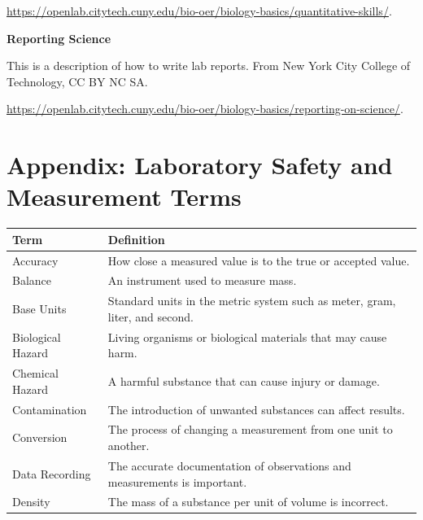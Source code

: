\documentclass[
  letterpaper,
  DIV=11,
  numbers=noendperiod]{scrreprt}
\newcounter{none} %
\begin{document}
\url{https://openlab.citytech.cuny.edu/bio-oer/biology-basics/quantitative-skills/}.

\textbf{Reporting Science}

This is a description of how to write lab reports. From New York City
College of Technology, CC BY NC SA.

\url{https://openlab.citytech.cuny.edu/bio-oer/biology-basics/reporting-on-science/}.

\section{\texorpdfstring{\textbf{Appendix: Laboratory Safety and
Measurement
Terms}}{Appendix: Laboratory Safety and Measurement Terms}}\label{appendix-laboratory-safety-and-measurement-terms}

{\def\LTcaptype{none} %
\begin{longtable}[]{@{}
  >{\raggedright\arraybackslash}p{}
  >{\raggedright\arraybackslash}p{}@{}}
\toprule\noalign{}
\begin{minipage}[b]{\linewidth}\raggedright
\textbf{Term}
\end{minipage} & \begin{minipage}[b]{\linewidth}\raggedright
\textbf{Definition}
\end{minipage} \\
\midrule\noalign{}
\endhead
\bottomrule\noalign{}
\endlastfoot
Accuracy & How close a measured value is to the true or accepted
value. \\
Balance & An instrument used to measure mass. \\
Base Units & Standard units in the metric system such as meter, gram,
liter, and second. \\
Biological Hazard & Living organisms or biological materials that may
cause harm. \\
Chemical Hazard & A harmful substance that can cause injury or
damage. \\
Contamination & The introduction of unwanted substances can affect
results. \\
Conversion & The process of changing a measurement from one unit to
another. \\
Data Recording & The accurate documentation of observations and
measurements is important. \\
Density & The mass of a substance per unit of volume is incorrect. \\

\end{longtable}}
\end{document}
